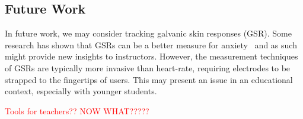 \subsection{Future Work}

In future work, we may consider tracking galvanic skin responses (GSR). Some research has shown that GSRs can be a better measure for anxiety~\cite{wang2017} and as such might provide new insights to instructors. However, the measurement techniques of GSRs are typically more invasive than heart-rate, requiring electrodes to be strapped to the fingertips of users. This may present an issue in an educational context, especially with younger students.

\textcolor{red}{Tools for teachers?? NOW WHAT?????}